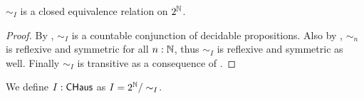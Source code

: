 \begin{corollary}
  $\sim_I$ is a closed equivalence relation on $2^{\mathbb{N}}$. 
\end{corollary}
\begin{proof}
  By , $\sim_I$ is a countable conjunction of decidable propositions. 
  Also by , $\sim_n$ is reflexive and symmetric for all $n:\mathbb{N}$, thus
  $\sim_I$ is reflexive and symmetric as well. 
  Finally $\sim_I$ is transitive as a consequence of .
\end{proof}
\begin{definition}
  We define $I:\mathsf{CHaus}$ as $I= 2^{\mathbb{N}}/\sim_I$. 
\end{definition}
%

%
%


%
%
%
%
